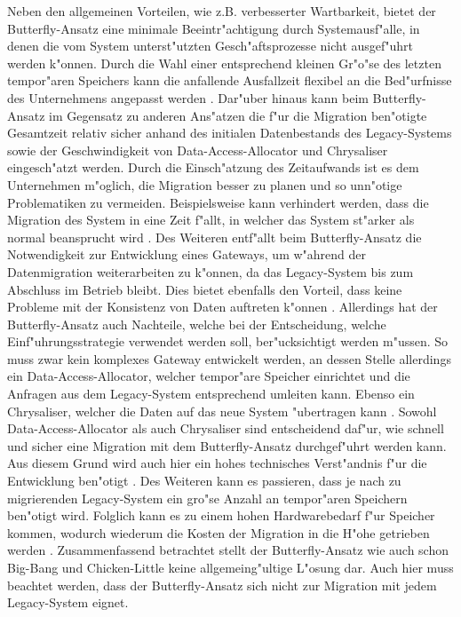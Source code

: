 \lb
Neben den allgemeinen Vorteilen, wie z.B. verbesserter Wartbarkeit, bietet der Butterfly-Ansatz eine minimale Beeintr"achtigung durch Systemausf"alle, in denen die vom System unterst"utzten Gesch"aftsprozesse nicht ausgef"uhrt werden k"onnen. Durch die Wahl einer entsprechend kleinen Gr"o"se des letzten tempor"aren Speichers kann die anfallende Ausfallzeit flexibel an die Bed"urfnisse des Unternehmens angepasst werden \citep[S.~204f.]{wuLawlessBisbal-1997}. Dar"uber hinaus kann beim Butterfly-Ansatz im Gegensatz zu anderen Ans"atzen die f"ur die Migration ben"otigte Gesamtzeit relativ sicher anhand des initialen Datenbestands des Legacy-Systems sowie der Geschwindigkeit von Data-Access-Allocator und Chrysaliser eingesch"atzt werden. Durch die Einsch"atzung des Zeitaufwands ist es dem Unternehmen m"oglich, die Migration besser zu planen und so unn"otige Problematiken zu vermeiden. Beispielsweise kann verhindert werden, dass die Migration des System in eine Zeit f"allt, in welcher das System st"arker als normal beansprucht wird \cite[S.~204]{wuLawlessBisbal-1997}. Des Weiteren entf"allt beim Butterfly-Ansatz die Notwendigkeit zur Entwicklung eines Gateways, um w"ahrend der Datenmigration weiterarbeiten zu k"onnen, da das Legacy-System bis zum Abschluss im Betrieb bleibt. Dies bietet ebenfalls den Vorteil, dass keine Probleme mit der Konsistenz von Daten auftreten k"onnen \citep[S.~3]{wuLawless-1997}.
\lb
Allerdings hat der Butterfly-Ansatz auch Nachteile, welche bei der Entscheidung, welche Einf"uhrungsstrategie verwendet werden soll, ber"ucksichtigt werden m"ussen. So muss zwar kein komplexes Gateway entwickelt werden, an dessen Stelle allerdings ein Data-Access-Allocator, welcher tempor"are Speicher einrichtet und die Anfragen aus dem Legacy-System entsprechend umleiten kann. Ebenso ein Chrysaliser, welcher die Daten auf das neue System "ubertragen kann \citep[S.~3]{wuLawless-1997}. Sowohl Data-Access-Allocator als auch Chrysaliser sind entscheidend daf"ur, wie schnell und sicher eine Migration mit dem Butterfly-Ansatz durchgef"uhrt werden kann. Aus diesem Grund wird auch hier ein hohes technisches Verst"andnis f"ur die Entwicklung ben"otigt \citep[S.~204]{wuLawlessBisbal-1997}. Des Weiteren kann es passieren, dass je nach zu migrierenden Legacy-System ein gro"se Anzahl an tempor"aren Speichern ben"otigt wird. Folglich kann es zu einem hohen Hardwarebedarf f"ur Speicher kommen, wodurch wiederum die Kosten der Migration in die H"ohe getrieben werden \citep[S.~109f.]{bisbal-1999}.
\lb
Zusammenfassend betrachtet stellt der Butterfly-Ansatz wie auch schon Big-Bang und Chicken-Little keine allgemeing"ultige L"osung dar. Auch hier muss beachtet werden, dass der Butterfly-Ansatz sich nicht zur Migration mit jedem Legacy-System eignet. 

